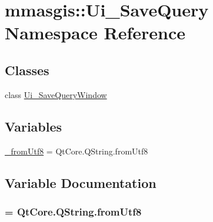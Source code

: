 \hypertarget{namespacemmasgis_1_1Ui__SaveQuery}{
\section{mmasgis::Ui\_\-SaveQuery Namespace Reference}
\label{namespacemmasgis_1_1Ui__SaveQuery}
}
\subsection*{Classes}
\begin{DoxyCompactItemize}
\item 
class \hyperlink{classmmasgis_1_1Ui__SaveQuery_1_1Ui__SaveQueryWindow}{Ui\_\-SaveQueryWindow}
\end{DoxyCompactItemize}
\subsection*{Variables}
\begin{DoxyCompactItemize}
\item 
\hyperlink{namespacemmasgis_1_1Ui__SaveQuery_ae3de3f36378ac80de941e6c2f54372b8}{\_\-fromUtf8} = QtCore.QString.fromUtf8
\end{DoxyCompactItemize}


\subsection{Variable Documentation}
\hypertarget{namespacemmasgis_1_1Ui__SaveQuery_ae3de3f36378ac80de941e6c2f54372b8}{
\subsubsection[{\_\-fromUtf8}]{ = QtCore.QString.fromUtf8}}
\label{namespacemmasgis_1_1Ui__SaveQuery_ae3de3f36378ac80de941e6c2f54372b8}
